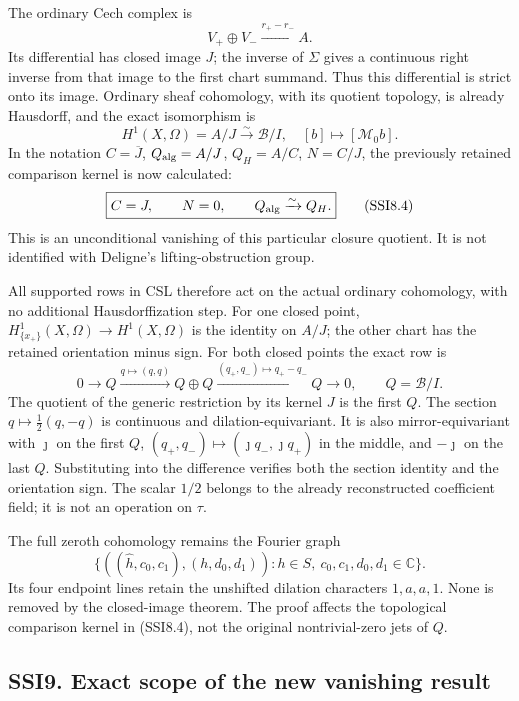 The ordinary Cech complex is \[
V_+\oplus V_-\xrightarrow{r_+-r_-}A.
\tag{SSI8.2}
\] Its differential has closed image \(J\); the inverse of \(\Sigma\)
gives a continuous right inverse from that image to the first chart
summand. Thus this differential is strict onto its image. Ordinary sheaf
cohomology, with its quotient topology, is already Hausdorff, and the
exact isomorphism is \[
\boxed{H^1(X,\Omega)=A/J\xrightarrow{\sim}\mathcal B/I,
\quad[b]\longmapsto[\mathcal M_0b].}
\tag{SSI8.3}
\] In the notation \(C=\overline J\), \(Q_{\rm alg}=A/J\), \(Q_H=A/C\),
\(N=C/J\), the previously retained comparison kernel is now calculated:
\[
\boxed{C=J,\qquad N=0,\qquad Q_{\rm alg}\xrightarrow{\sim}Q_H.}
\tag{SSI8.4}
\] This is an unconditional vanishing of this particular closure
quotient. It is not identified with Deligne's lifting-obstruction group.

All supported rows in CSL therefore act on the actual ordinary
cohomology, with no additional Hausdorffization step. For one closed
point, \(H^1_{\{x_+\}}(X,\Omega)\to H^1(X,\Omega)\) is the identity on
\(A/J\); the other chart has the retained orientation minus sign. For
both closed points the exact row is \[
0\longrightarrow Q\xrightarrow{q\mapsto(q,q)}Q\oplus Q
\xrightarrow{(q_+,q_-)\mapsto q_+-q_-}Q\longrightarrow0,
\qquad Q=\mathcal B/I.
\tag{SSI8.5}
\] The quotient of the generic restriction by its kernel \(J\) is the
first \(Q\). The section \(q\mapsto\tfrac12(q,-q)\) is continuous and
dilation-equivariant. It is also mirror-equivariant with \(\jmath\) on
the first \(Q\), \((q_+,q_-)\mapsto(\jmath q_-,\jmath q_+)\) in the
middle, and \(-\jmath\) on the last \(Q\). Substituting into the
difference verifies both the section identity and the orientation sign.
The scalar \(1/2\) belongs to the already reconstructed coefficient
field; it is not an operation on \(\tau\).

The full zeroth cohomology remains the Fourier graph \[
\{((\widehat h,c_0,c_1),(h,d_0,d_1)):
h\in S,\ c_0,c_1,d_0,d_1\in\mathbb C\}.
\tag{SSI8.6}
\] Its four endpoint lines retain the unshifted dilation characters
\(1,a,a,1\). None is removed by the closed-image theorem. The proof
affects the topological comparison kernel in (SSI8.4), not the original
nontrivial-zero jets of \(Q\).

\subsection{SSI9. Exact scope of the new vanishing
result}\label{ssi9.-exact-scope-of-the-new-vanishing-result}

